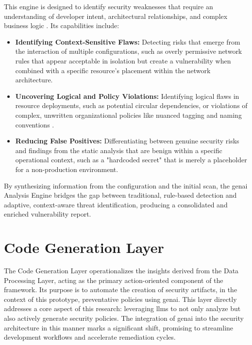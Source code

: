 This engine is designed to identify security weaknesses that require an understanding of developer intent, architectural relationships, and complex business logic \cite{noseevich_towards_2015}. Its capabilities include:

\begin{itemize}
\item \textbf{Identifying Context-Sensitive Flaws:} Detecting risks that emerge from the interaction of multiple configurations, such as overly permissive network rules that appear acceptable in isolation but create a vulnerability when combined with a specific resource's placement within the network architecture\cite{zhang_empirical_2024}.
\item \textbf{Uncovering Logical and Policy Violations:} Identifying logical flaws in resource deployments, such as potential circular dependencies, or violations of complex, unwritten organizational policies like nuanced tagging and naming conventions \cite{khanna_enhancing_2024}.
\item \textbf{Reducing False Positives:} Differentiating between genuine security risks and findings from the static analysis that are benign within a specific operational context, such as a "hardcoded secret" that is merely a placeholder for a non-production environment.
\end{itemize}

By synthesizing information from the configuration and the initial scan, the \gls{genai} Analysis Engine bridges the gap between traditional, rule-based detection and adaptive, context-aware threat identification, producing a consolidated and enriched vulnerability report.


\section{Code Generation Layer}
\label{sec:code-generation-layer}

The Code Generation Layer operationalizes the insights derived from the Data Processing Layer, acting as the primary action-oriented component of the framework. Its purpose is to automate the creation of security artifacts, in the context of this prototype, preventative policies using \gls{genai}. This layer directly addresses a core aspect of this research: leveraging \glspl{llm} to not only analyze but also actively generate security policies. The integration of \gls{genai} into the security architecture in this manner marks a significant shift, promising to streamline development workflows and accelerate remediation cycles.

